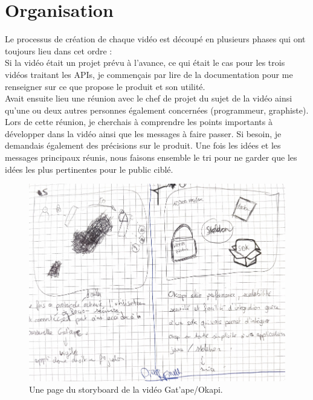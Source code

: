 \section{Organisation}
Le processus de création de chaque vidéo est découpé en plusieurs phases qui ont toujours lieu dans cet ordre :\\

Si la vidéo était un projet prévu à l'avance, ce qui était le cas pour les trois vidéos traitant les APIs, je commençais par lire de la documentation pour me renseigner sur ce que propose le produit et son utilité.\\

Avait ensuite lieu une réunion avec le chef de projet du sujet de la vidéo ainsi qu'une ou deux autres personnes également concernées (programmeur, graphiste). Lors de cette réunion, je cherchais à comprendre les points importants à développer dans la vidéo ainsi que les messages à faire passer. Si besoin, je demandais également des précisions sur le produit. Une fois les idées et les messages principaux réunis, nous faisons ensemble le tri pour ne garder que les idées les plus pertinentes pour le public ciblé.\\





\begin{figure}[htp]
  \centering
  \includegraphics[width=15cm]{images/sb/sb1}
  \caption{Une page du storyboard de la vidéo Gat'ape/Okapi.}
  \label{sbzbus}
\end{figure}




